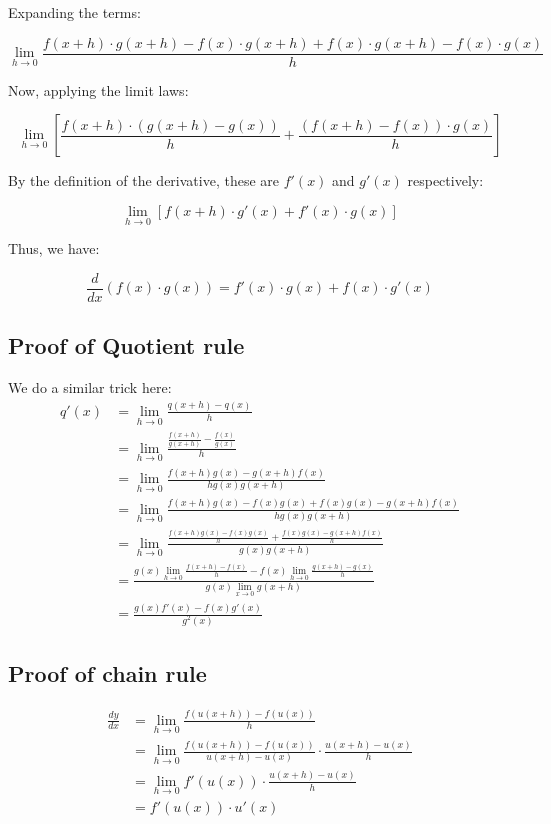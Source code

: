 Expanding the terms:

\[
\lim_{{h \to 0}} \frac{f(x + h) \cdot g(x + h) - f(x) \cdot g(x + h) + f(x) \cdot g(x + h) - f(x) \cdot g(x)}{h}
\]

Now, applying the limit laws:

\[
\lim_{{h \to 0}} \left[\frac{f(x + h) \cdot (g(x + h) - g(x))}{h} + \frac{(f(x + h) - f(x)) \cdot g(x)}{h}\right]
\]

By the definition of the derivative, these are \( f'(x) \) and \( g'(x) \) respectively:

\[
\lim_{{h \to 0}} \left[f(x + h) \cdot g'(x) + f'(x) \cdot g(x)\right]
\]

Thus, we have:

\[
\frac{d}{dx}(f(x) \cdot g(x)) = f'(x) \cdot g(x) + f(x) \cdot g'(x)
\]

\subsection{Proof of Quotient rule}

We do a similar trick here:
$$
\begin{aligned}
q'(x) &= \lim_{h \to 0}\frac{q(x+h)-q(x)}{h} \\
&= \lim_{h \to 0}\frac{\frac{f(x+h)}{g(x+h)}-\frac{f(x)}{g(x)}}{h} \\
&= \lim_{h \to 0} \frac{f(x+h)g(x)-g(x+h)f(x)}{hg(x)g(x+h)} \\
&= \lim_{h \to 0}\frac{f(x+h)g(x)-f(x)g(x)+f(x)g(x)-g(x+h)f(x)}{hg(x)g(x+h)} \\
&= \lim_{h \to 0}\frac{\frac{f(x+h)g(x)-f(x)g(x)}{h}+\frac{f(x)g(x)-g(x+h)f(x)}{h}}{g(x)g(x+h)} \\
&= \frac{g(x)\lim_{h \to 0}\frac{f(x+h)-f(x)}{h}-f(x) \lim_{h \to 0}\frac{g(x+h)-g(x)}{h}}{g(x) \lim_{x \to 0}g(x+h)} \\
&= \frac{g(x)f'(x)-f(x)g'(x)}{g^2(x)}
\end{aligned}
$$

\subsection{Proof of chain rule}

$$\begin{aligned}
\frac{dy}{dx} &= \lim_{h \to 0} \frac{f(u(x+h)) - f(u(x))}{h} \\
&= \lim_{h \to 0} \frac{f(u(x+h)) - f(u(x))}{u(x+h) - u(x)} \cdot \frac{u(x+h) - u(x)}{h} \\
&= \lim_{h \to 0} f'(u(x)) \cdot \frac{u(x+h) - u(x)}{h} \\
&= f'(u(x)) \cdot u'(x)
\end{aligned}
$$

